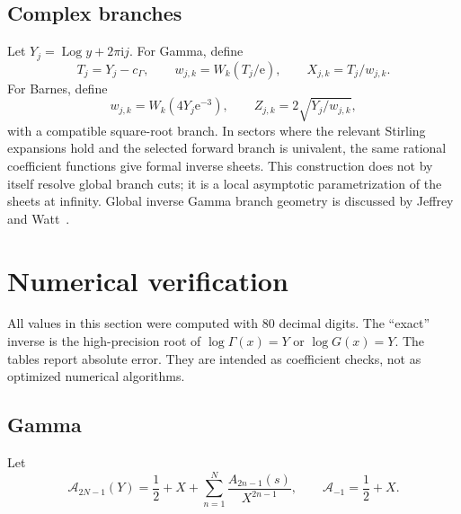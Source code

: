 \documentclass[11pt,a4paper]{article}
\numberwithin{equation}{section}
\theoremstyle{definition}
\theoremstyle{remark}
\newcommand{\e}{\mathrm e}
\newcommand{\Log}{\operatorname{Log}}
\begin{document}
\subsection{Complex branches}

Let \(Y_j=\Log y+2\pi\mathrm i j\).  For Gamma, define
\begin{equation}
 T_j=Y_j-c_\Gamma,
 \qquad w_{j,k}=W_k(T_j/\e),
 \qquad X_{j,k}=T_j/w_{j,k}.
 \label{eq:gamma-complex-branches}
\end{equation}
For Barnes, define
\begin{equation}
 w_{j,k}=W_k(4Y_j\e^{-3}),
 \qquad Z_{j,k}=2\sqrt{Y_j/w_{j,k}},
 \label{eq:barnes-complex-branches}
\end{equation}
with a compatible square-root branch.  In sectors where the relevant
Stirling expansions hold and the selected forward branch is univalent,
the same rational coefficient functions give formal inverse sheets.  This
construction does not by itself resolve global branch cuts; it is a local
asymptotic parametrization of the sheets at infinity.  Global inverse
Gamma branch geometry is discussed by Jeffrey and Watt~\cite{JeffreyWatt}.

\section{Numerical verification}

All values in this section were computed with 80 decimal digits.  The
``exact'' inverse is the high-precision root of
\(\log\Gamma(x)=Y\) or \(\log G(x)=Y\).  The tables report absolute error.
They are intended as coefficient checks, not as optimized numerical
algorithms.

\subsection{Gamma}

Let
\begin{equation}
 \mathcal A_{2N-1}(Y)=\frac12+X+
 \sum_{n=1}^{N}\frac{A_{2n-1}(s)}{X^{2n-1}},
 \qquad \mathcal A_{-1}=\frac12+X.
 \label{eq:A-trunc}
\end{equation}
\end{document}
